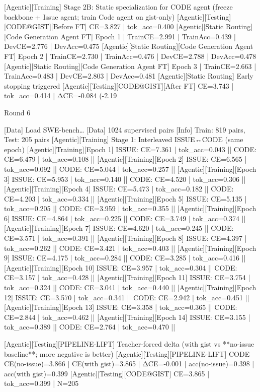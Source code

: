  [Agentic][Training] Stage 2B: Static specialization for CODE agent (freeze backbone + Issue agent; train Code agent on gist-only)
 [Agentic][Testing][CODE@GIST][Before FT] CE=3.827 | tok_acc=0.400
 [Agentic][Static Routing][Code Generation Agent FT] Epoch 1 | TrainCE=2.991 | TrainAcc=0.439 | DevCE=2.776 | DevAcc=0.475
 [Agentic][Static Routing][Code Generation Agent FT] Epoch 2 | TrainCE=2.730 | TrainAcc=0.476 | DevCE=2.788 | DevAcc=0.478
 [Agentic][Static Routing][Code Generation Agent FT] Epoch 3 | TrainCE=2.663 | TrainAcc=0.483 | DevCE=2.803 | DevAcc=0.481
 [Agentic][Static Routing] Early stopping triggered
 [Agentic][Testing][CODE@GIST][After FT] CE=3.743 | tok_acc=0.414 | ΔCE=-0.084 (-2.19%
 
 Round 6 
 
 [Data] Load SWE-bench…
 [Data] 1024 supervised pairs
 [Info] Train: 819 pairs, Test: 205 pairs
 [Agentic][Training] Stage 1: Interleaved ISSUE↔CODE (same epoch)
 [Agentic][Training][Epoch 1] ISSUE: CE=7.361 | tok_acc=0.043  ||  CODE: CE=6.479 | tok_acc=0.108  ||  
 [Agentic][Training][Epoch 2] ISSUE: CE=6.565 | tok_acc=0.092  ||  CODE: CE=5.044 | tok_acc=0.257  ||  
 [Agentic][Training][Epoch 3] ISSUE: CE=5.953 | tok_acc=0.140  ||  CODE: CE=4.520 | tok_acc=0.306  ||  
 [Agentic][Training][Epoch 4] ISSUE: CE=5.473 | tok_acc=0.182  ||  CODE: CE=4.203 | tok_acc=0.334  ||  
 [Agentic][Training][Epoch 5] ISSUE: CE=5.135 | tok_acc=0.205  ||  CODE: CE=3.959 | tok_acc=0.355  ||  
 [Agentic][Training][Epoch 6] ISSUE: CE=4.864 | tok_acc=0.225  ||  CODE: CE=3.749 | tok_acc=0.374  ||  
 [Agentic][Training][Epoch 7] ISSUE: CE=4.620 | tok_acc=0.245  ||  CODE: CE=3.571 | tok_acc=0.391  ||  
 [Agentic][Training][Epoch 8] ISSUE: CE=4.397 | tok_acc=0.262  ||  CODE: CE=3.421 | tok_acc=0.403  ||  
 [Agentic][Training][Epoch 9] ISSUE: CE=4.175 | tok_acc=0.284  ||  CODE: CE=3.285 | tok_acc=0.416  ||  
 [Agentic][Training][Epoch 10] ISSUE: CE=3.957 | tok_acc=0.304  ||  CODE: CE=3.157 | tok_acc=0.428  ||  
 [Agentic][Training][Epoch 11] ISSUE: CE=3.754 | tok_acc=0.324  ||  CODE: CE=3.041 | tok_acc=0.440  ||  
 [Agentic][Training][Epoch 12] ISSUE: CE=3.570 | tok_acc=0.341  ||  CODE: CE=2.942 | tok_acc=0.451  ||  
 [Agentic][Training][Epoch 13] ISSUE: CE=3.358 | tok_acc=0.365  ||  CODE: CE=2.844 | tok_acc=0.462  ||  
 [Agentic][Training][Epoch 14] ISSUE: CE=3.155 | tok_acc=0.389  ||  CODE: CE=2.764 | tok_acc=0.470  ||  
 
 [Agentic][Testing][PIPELINE-LIFT] Teacher-forced delta (with gist vs **no-issue baseline**; more negative is better)
 [Agentic][Testing][PIPELINE-LIFT] CODE CE(no-issue)=3.866 | CE(with gist)=3.865 | ΔCE=-0.001 | acc(no-issue)=0.398 | acc(with gist)=0.399
 [Agentic][Testing][CODE@GIST] CE=3.865 | tok_acc=0.399 | N=205
 
